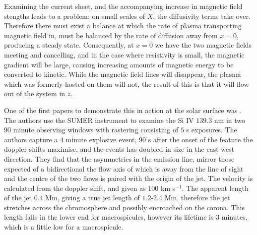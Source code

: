 Examining the current sheet, and the accompanying increase in magnetic field stengths leads to a problem; on small scales of $X$, the diffusivity terms take over.
Therefore there must exist a balance at which the rate of plasma transporting magnetic field in, must be balanced by the rate of diffusion away from $x = 0$, producing a steady state.
Consequently, at $x = 0$ we have the two magnetic fields meeting and cancelling, and in the case where resistivity is small, the magnetic gradient will be large, causing increasing amounts of magnetic energy to be converted to kinetic.
While the magnetic field lines will disappear, the plasma which was formerly hosted on them will not, the result of this is that it will flow out of the system in $z$.

One of the first papers to demonstrate this in action at the solar surface was \cite{Innes1997}.
The authors use the SUMER instrument to examine the Si IV $139.3$ nm in two $90$ minute observing windows with rastering consisting of $5$ s exposures.
The authors capture a $4$ minute explosive event, $90$ s after the onset of the feature the doppler shifts maximise, and the events has doubled in size in the east-west direction.
They find that the asymmetries in the emission line, mirror those expected of a bidirectional the flow axis of which is away from the line of sight and the centre of the two flows is paired with the origin of the jet.
The velocity is calculated from the doppler shift, and given as $100$ km s$^{-1}$.
The apparent length of the jet $0.4$ Mm, giving a true jet length of $1.2$-$2.4$ Mm, therefore the jet stretches across the chromosphere and possibly encroached on the corona.
This length falls in the lower end for macrospicules, however its lifetime is $3$ minutes, which is a little low for a macrospicule.


